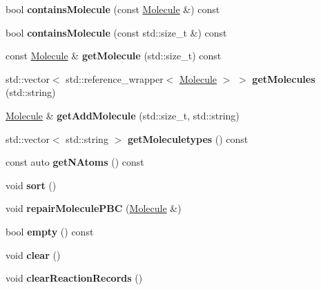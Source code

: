 \begin{DoxyCompactItemize}
bool {\bfseries contains\+Molecule} (const \mbox{\hyperlink{classMolecule}{Molecule}} \&) const
\item 
\mbox{\label{classTopology_a5bffe8e0a383173f10e447c95fdaef9e}} 
bool {\bfseries contains\+Molecule} (const std\+::size\+\_\+t \&) const
\item 
\mbox{\label{classTopology_a24590a20d20d07d4807d1e28da3c55e5}} 
const \mbox{\hyperlink{classMolecule}{Molecule}} \& {\bfseries get\+Molecule} (std\+::size\+\_\+t) const
\item 
\mbox{\label{classTopology_a9f3a2f9b847f89d5bbfd214d96391e77}} 
std\+::vector$<$ std\+::reference\+\_\+wrapper$<$ \mbox{\hyperlink{classMolecule}{Molecule}} $>$ $>$ {\bfseries get\+Molecules} (std\+::string)
\item 
\mbox{\label{classTopology_a53c46d18870e7610f73024504ff1ebcd}} 
\mbox{\hyperlink{classMolecule}{Molecule}} \& {\bfseries get\+Add\+Molecule} (std\+::size\+\_\+t, std\+::string)
\item 
\mbox{\label{classTopology_a57508c2466292d7f42b1b446a514ab70}} 
std\+::vector$<$ std\+::string $>$ {\bfseries get\+Moleculetypes} () const
\item 
\mbox{\label{classTopology_ab26d60ea35ac26b9afb849e1390648e3}} 
const auto {\bfseries get\+N\+Atoms} () const
\item 
\mbox{\label{classTopology_a7f61d561ac897adf0a9735ed66fa70b5}} 
void {\bfseries sort} ()
\item 
\mbox{\label{classTopology_a75a2d3933bc3af05e1ae0539b198d1a2}} 
void {\bfseries repair\+Molecule\+P\+BC} (\mbox{\hyperlink{classMolecule}{Molecule}} \&)
\item 
\mbox{\label{classTopology_a785d0b5028f6f0c2d42fbb726c4ecc2c}} 
bool {\bfseries empty} () const
\item 
\mbox{\label{classTopology_a156c05ef747fba350adc5f790a16367a}} 
void {\bfseries clear} ()
\item 
\mbox{\label{classTopology_aa549f8bec1377e04c677c24787d412ac}} 
void {\bfseries clear\+Reaction\+Records} ()
\end{DoxyCompactItemize}

